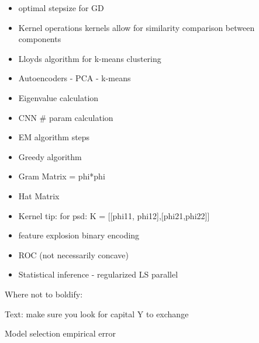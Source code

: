 \begin{itemize}
    \item optimal stepsize for GD
    \item Kernel operations
    kernels allow for similarity comparison between components
    \item Lloyds algorithm for k-means clustering
    \item Autoencoders - PCA - k-means
    \item Eigenvalue calculation
    \item CNN # param calculation
    \item EM algorithm steps
    \item Greedy algorithm
    \item Gram Matrix = phi*phi
    \item Hat Matrix
    \item Kernel tip: for psd: K = [[phi11, phi12],[phi21,phi22]]
    \item feature explosion binary encoding
    \item ROC (not necessarily concave)
    \item Statistical inference - regularized LS parallel
\end{itemize}

Where not to boldify:

Text:
make sure you look for capital Y to exchange

Model selection empirical error